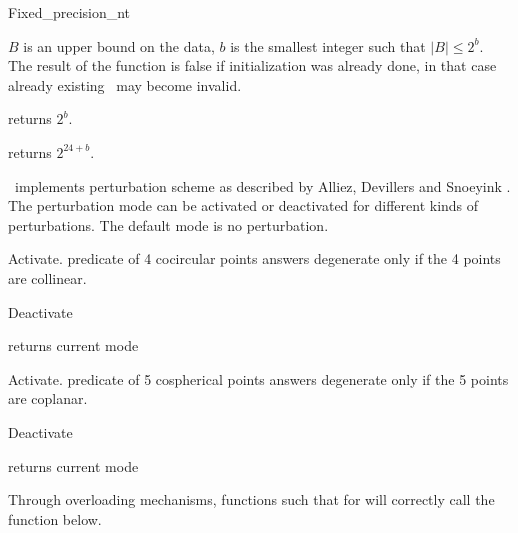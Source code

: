 \begin{ccRefClass}{Fixed_precision_nt}

{$B$ is an upper bound on the data, $b$ is the smallest integer such that 
$|B|\leq 2^b$. The result of the function is false if initialization was
already done, in that case already existing \ccClassName\ may become invalid.}

{returns $2^b$.}

{returns $2^{24+b}$.}


\ccClassName\ implements perturbation scheme as described by
Alliez, Devillers and Snoeyink \cite{ads-rdppw-98}.
The perturbation mode can be activated or deactivated for different kinds
of perturbations. The default mode is no perturbation.

{Activate.  predicate
 of 4 cocircular points answers degenerate only if
the 4 points are collinear.}

{Deactivate}

{returns current mode}

{Activate.  predicate
 of 5 cospherical points answers degenerate only if
the 5 points are coplanar.}

{Deactivate}

{returns current mode}


Through overloading mechanisms, functions such that
 for 
will correctly call the function below.



\end{ccRefClass}
